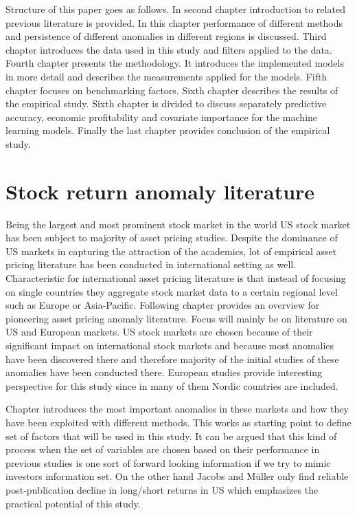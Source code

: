 \documentclass{article}
\begin{document}
Structure of this paper goes as follows. In second chapter introduction to related previous literature is provided. In this chapter performance of different methods and persistence of different anomalies in different regions is discussed. Third chapter introduces the data used in this study and filters applied to the data. Fourth chapter presents the methodology. It introduces the implemented models in more detail and describes the measurements applied for the models. Fifth chapter focuses on benchmarking factors. Sixth chapter describes the results of the empirical study. Sixth chapter is divided to discuss separately predictive accuracy, economic profitability and covariate importance for the machine learning models. Finally the last chapter provides conclusion of the empirical study. \par

\section{Stock return anomaly literature}\label{StockReturnAnomalyLiterature}

Being the largest and most prominent stock market in the world US stock market has been subject to majority of asset pricing studies. Despite the dominance of US markets in capturing the attraction of the academics, lot of empirical asset pricing literature has been conducted in international setting as well. Characteristic for international asset pricing literature is that instead of focusing on single countries they aggregate stock market data to a certain regional level such as Europe or Asia-Pacific. Following chapter provides an overview for pioneering asset pricing anomaly literature. Focus will mainly be on literature on US and European markets. US stock markets are chosen because of their significant impact on international stock markets and because most anomalies have been discovered there and therefore majority of the initial studies of these anomalies have been conducted there. European studies provide interesting perspective for this study since in many of them Nordic countries are included. \par

Chapter introduces the most important anomalies in these markets and how they have been exploited with different methods. This works as starting point to define set of factors that will be used in this study. It can be argued that this kind of process when the set of variables are chosen based on their performance in previous studies is one sort of forward looking information if we try to mimic investors information set. On the other hand Jacobs and Müller \citeyear{JACOBS2020213} only find reliable post-publication decline in long/short returns in US which emphasizes the practical potential of this study. \par
\end{document}
